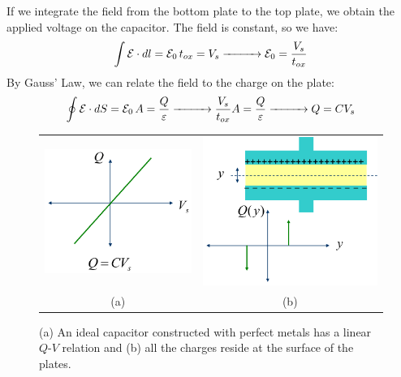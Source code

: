 If we integrate the field from the bottom plate to the top plate, we obtain the applied voltage on the capacitor.  The field is constant, so we have:
    \begin{equation} 
        \int {\mathcal{E} \cdot dl} = {\mathcal{E}_0}\,t_{ox} = V_s \xrightarrow{\hspace*{1cm}}{\mathcal{E}_0} = \frac{V_s}{t_{ox}} 
    \end{equation}
By Gauss' Law, we can relate the field to the charge on the plate:
    \begin{equation} 
        \oint {\mathcal{E} \cdot dS} = {\mathcal{E}_0}\,A = \frac{Q}{\varepsilon} \xrightarrow{\hspace*{1cm}}
        \frac{{{V_s}}}{{{t_{ox}}}}A = \frac{Q}{\varepsilon } \xrightarrow{\hspace*{1cm}}
        Q = C{V_s}
    \end{equation}
\newpage
\noindent
\begin{figure}[tb]
\centering
\begin{tabular}{cc}
\includegraphics[width=.35\columnwidth]{mod2-2_ICtech_sld_19} &
\includegraphics[width=.35\columnwidth]{mod2-2_ICtech_sld_19b}\\
(a) & (b)\\
\end{tabular}
\caption{(a) An ideal capacitor constructed with perfect metals has a linear $Q$-$V$ relation and (b) all the charges reside at the surface of the plates.}
\label{fig:mod2-2_ICtech_sld_19}
\end{figure}
